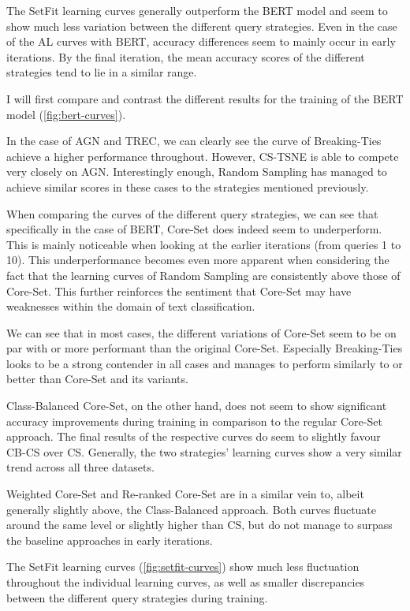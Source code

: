 \documentclass[english,bachelor,ul]{webisthesis} %
\begin{document}
The SetFit learning curves generally outperform the BERT model and seem to show much less variation between the different query strategies. Even in the case of the AL curves with BERT, accuracy differences seem to mainly occur in early iterations. By the final iteration, the mean accuracy scores of the different strategies tend to lie in a similar range. 

I will first compare and contrast the different results for the training of the BERT model (\ref{fig:bert-curves}). 

In the case of AGN and TREC, we can clearly see the curve of Breaking-Ties achieve a higher performance throughout. However, CS-TSNE is able to compete very closely on AGN. Interestingly enough, Random Sampling has managed to achieve similar scores in these cases to the strategies mentioned previously.

When comparing the curves of the different query strategies, we can see that specifically in the case of BERT, Core-Set does indeed seem to underperform. This is mainly noticeable when looking at the earlier iterations (from queries 1 to 10). This underperformance becomes even more apparent when considering the fact that the learning curves of Random Sampling are consistently above those of Core-Set. This further reinforces the sentiment that Core-Set may have weaknesses within the domain of text classification. 

We can see that in most cases, the different variations of Core-Set seem to be on par with or more performant than the original Core-Set. Especially Breaking-Ties looks to be a strong contender in all cases and manages to perform similarly to or better than Core-Set and its variants.

Class-Balanced Core-Set, on the other hand, does not seem to show significant accuracy improvements during training in comparison to the regular Core-Set approach. The final results of the respective curves do seem to slightly favour CB-CS over CS. Generally, the two strategies' learning curves show a very similar trend across all three datasets. 

Weighted Core-Set and Re-ranked Core-Set are in a similar vein to, albeit generally slightly above, the Class-Balanced approach. Both curves fluctuate around the same level or slightly higher than CS, but do not manage to surpass the baseline approaches in early iterations.

The SetFit learning curves (\ref{fig:setfit-curves}) show much less fluctuation throughout the individual learning curves, as well as smaller discrepancies between the different query strategies during training. 
\end{document}
